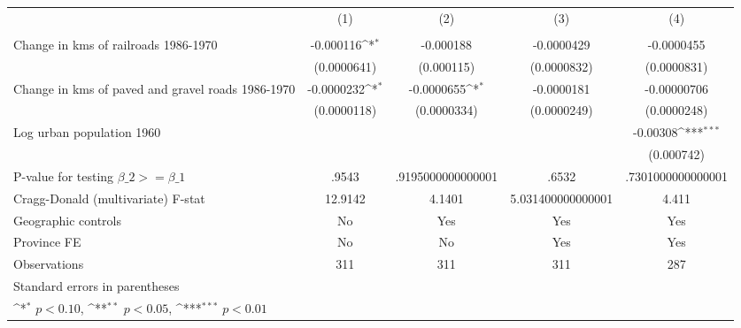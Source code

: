 {
\def\sym#1{\ifmmode^{#1}\else\(^{#1}\)\fi}
\begin{tabular}{l*{4}{c}}
\hline\hline
                &\multicolumn{1}{c}{(1)}&\multicolumn{1}{c}{(2)}&\multicolumn{1}{c}{(3)}&\multicolumn{1}{c}{(4)}\\
                &\multicolumn{1}{c}{}&\multicolumn{1}{c}{}&\multicolumn{1}{c}{}&\multicolumn{1}{c}{}\\
\hline
Change in kms of railroads 1986-1970&-0.000116\sym{*}  &-0.000188         &-0.0000429         &-0.0000455         \\
                &(0.0000641)         &(0.000115)         &(0.0000832)         &(0.0000831)         \\
[1em]
Change in kms of paved and gravel roads 1986-1970&-0.0000232\sym{*}  &-0.0000655\sym{*}  &-0.0000181         &-0.00000706         \\
                &(0.0000118)         &(0.0000334)         &(0.0000249)         &(0.0000248)         \\
[1em]
Log urban population 1960&                  &                  &                  & -0.00308\sym{***}\\
                &                  &                  &                  &(0.000742)         \\
\hline
P-value for testing $\beta\_{2} >= \beta\_{1}$&    .9543         &.9195000000000001         &    .6532         &.7301000000000001         \\
Cragg-Donald (multivariate) F-stat&  12.9142         &   4.1401         &5.031400000000001         &    4.411         \\
Geographic controls&       No         &      Yes         &      Yes         &      Yes         \\
Province FE     &       No         &       No         &      Yes         &      Yes         \\
Observations    &      311         &      311         &      311         &      287         \\
\hline\hline
\multicolumn{5}{l}{\footnotesize Standard errors in parentheses}\\
\multicolumn{5}{l}{\footnotesize \sym{*} \(p<0.10\), \sym{**} \(p<0.05\), \sym{***} \(p<0.01\)}\\
\end{tabular}
}
